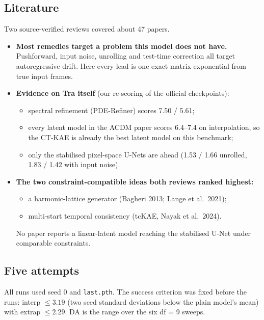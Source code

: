 \subsection{Literature}\label{sec:lit4}

Two source-verified reviews covered about 47 papers.
\begin{itemize}
\item \textbf{Most remedies target a problem this model does not have.} Pushforward, input
  noise, unrolling and test-time correction all target autoregressive drift. Here every lead
  is one exact matrix exponential from true input frames.
\item \textbf{Evidence on Tra itself} (our re-scoring of the official checkpoints):
  \begin{itemize}
  \item spectral refinement (PDE-Refiner) scores 7.50 / 5.61;
  \item every latent model in the ACDM paper scores 6.4--7.4 on interpolation, so the
    CT-KAE is already the best latent model on this benchmark;
  \item only the stabilised pixel-space U-Nets are ahead (1.53 / 1.66 unrolled, 1.83 / 1.42
    with input noise).
  \end{itemize}
\item \textbf{The two constraint-compatible ideas both reviews ranked highest:}
  \begin{itemize}
  \item a harmonic-lattice generator (Bagheri 2013; Lange et al.\ 2021);
  \item multi-start temporal consistency (tcKAE, Nayak et al.\ 2024).
  \end{itemize}
  No paper reports a linear-latent model reaching the stabilised U-Net under comparable
  constraints.
\end{itemize}

\subsection{Five attempts}\label{sec:attempts4}

All runs used seed 0 and \texttt{last.pth}. The success criterion was fixed before the
runs: interp $\le 3.19$ (two seed standard deviations below the plain model's mean) with
extrap $\le 2.29$. DA is the range over the six df = 9 sweeps.


